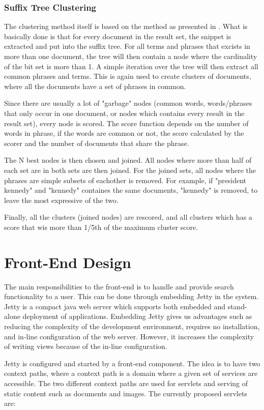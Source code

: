 \subsubsection{Suffix Tree Clustering}

The clustering method itself is based on the method as presented in \cite{zamir}. What is basically done is that for every document in the result set, the snippet is extracted and put into the suffix tree. For all terms and phrases that excists in more than one document, the tree will then contain a node where the cardinality of the bit set is more than 1. A simple iteration over the tree will then extract all common phrases and terms. This is again used to create clusters of documents, where all the documents have a set of phrases in common.

Since there are usually a lot of "garbage" nodes (common words, words/phrases that only occur in one document, or nodes which contains every result in the result set), every node is scored. The score function depends on the number of words in phrase, if the words are common or not, the score calculated by the scorer and the number of documents that share the phrase. 

The N best nodes is then chosen and joined. All nodes where more than half of each set are in both sets are then joined. For the joined sets,  all nodes where the phrases are simple subsets of eachother is removed. For example, if "president kennedy" and "kennedy" containes the same documents, "kennedy" is removed, to leave the most expressive of the two.

Finally, all the clusters (joined nodes) are rescored, and all clusters which has a score that wis more than 1/5th of the maximum cluster score.

\section{Front-End Design}
The main responsibilities to the front-end is to handle and provide search functionality to a user. This can be done through embedding Jetty in the system. Jetty is a compact java web server which supports both embedded and stand-alone deployment of applications. Embedding Jetty gives us advantages such as reducing the complexity of the development environment, requires no installation, and in-line configuration of the web server. However, it increases the complexity of writing views because of the in-line configuration.

Jetty is configured and started by a front-end component. The idea is to have two context paths, where a context path is a domain where a given set of services are accessible. The two different context paths are used for servlets and serving of static content such as documents and images. The currently proposed servlets are:

